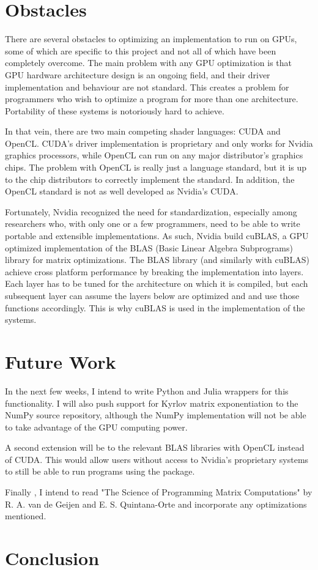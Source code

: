 \documentclass[%
 reprint,
 amsmath,amssymb,
 aps,
]{revtex4-1}
\begin{document}


\section{Obstacles}

There are several obstacles to optimizing an implementation to run on GPUs, some of which are specific to this project and not all of which have been completely overcome. The main problem with any GPU optimization is that GPU hardware architecture design is an ongoing field, and their driver implementation and behaviour are not standard. This creates a problem for programmers who wish to optimize a program for more than one architecture. Portability of these systems is notoriously hard to achieve. %

In that vein, there are two main competing shader languages: CUDA and OpenCL. CUDA's driver implementation is proprietary and only works for Nvidia graphics processors, while OpenCL can run on any major distributor's graphics chips. The problem with OpenCL is really just a language standard, but it is up to the chip distributors to correctly implement the standard. In addition, the OpenCL standard is not as well developed as Nvidia's CUDA. %

Fortunately, Nvidia recognized the need for standardization, especially among researchers who, with only one or a few programmers, need to be able to write portable and extensible implementations. As such, Nvidia build cuBLAS, a GPU optimized implementation of the BLAS (Basic Linear Algebra Subprograms) library for matrix optimizations. The BLAS library (and similarly with cuBLAS) achieve cross platform performance by breaking the implementation into layers. Each layer has to be tuned for the architecture on which it is compiled, but each subsequent layer can assume the layers below are optimized and and use those functions accordingly. This is why cuBLAS is used in the implementation of the systems.


\section{Future Work}

In the next few weeks, I intend to write Python and Julia wrappers for this functionality. I will also push support for Kyrlov matrix exponentiation to the NumPy source repository, although the NumPy implementation will not be able to take advantage of the GPU computing power.

A second extension will be to the relevant BLAS libraries with OpenCL instead of CUDA. This would allow users without access to Nvidia's proprietary systems to still be able to run programs using the package.

Finally , I intend to read "The Science of Programming Matrix Computations" by R. A. van de Geijen and E. S. Quintana-Orte and incorporate any optimizations mentioned.

\section{Conclusion}
\end{document}
